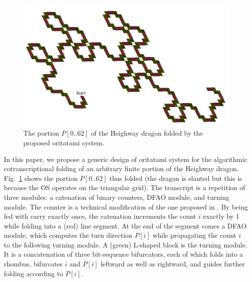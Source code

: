\begin{figure}
\vspace*{-5mm}
\centering
\includegraphics[width=\linewidth]{pic/6bit_heighway.pdf}
\caption{The portion $P[0 .. 62]$ of the Heighway dragon folded by the proposed oritatami system.}
\label{fig:heighway6_oritatami}
\vspace*{-5mm}
\end{figure}

In this paper, we propose a generic design of oritatami system for the algorithmic cotranscriptional folding of an arbitrary finite portion of the Heighway dragon. 
Fig.~\ref{fig:heighway6_oritatami} shows the portion $P[0 .. 62]$ thus folded (the dragon is slanted but this is because the OS operates on the triangular grid). 
The transcript is a repetition of three modules: a catenation of binary counters, DFAO module, and turning module. 
The counter is a technical modification of the one proposed in \cite{GeMeScSe2016}. 
By being fed with carry exactly once, the catenation increments the count $i$ exactly by 1 while folding into a (red) line segment. 
At the end of the segment comes a DFAO module, which computes the turn direction $P[i]$ while propagating the count $i$ to the following turning module. 
A (green) L-shaped block is the turning module. 
It is a concatenation of three bit-sequence bifurcators, each of which folds into a rhombus, bifurcates $i$ and $P[i]$ leftward as well as rightward, and guides further folding according to $P[i]$. 

